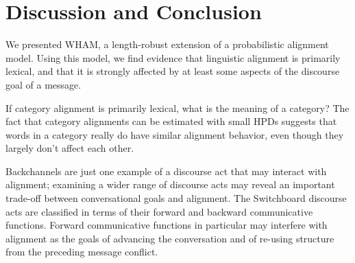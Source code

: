 \documentclass[11pt]{article}
\begin{document}
\section{Discussion and Conclusion}
We presented WHAM, a length-robust extension of a probabilistic alignment model. Using this model, we find evidence that linguistic alignment is primarily lexical, and that it is strongly affected by at least some aspects of the discourse goal of a message.  

If category alignment is primarily lexical, what is the meaning of a category? The fact that category alignments can be estimated with small HPDs suggests that words in a category really do have similar alignment behavior, even though they largely don't affect each other. 

Backchannels are just one example of a discourse act that may interact with alignment; examining a wider range of discourse acts may reveal an important trade-off between conversational goals and alignment. The Switchboard discourse acts are classified in terms of their forward and backward communicative functions. Forward communicative functions in particular may interfere with alignment as the goals of advancing the conversation and of re-using structure from the preceding message conflict.


%

%
%
\newpage



\appendix


\end{document}
